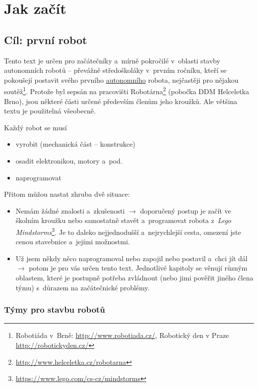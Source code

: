 \section{Jak začít}

\subsection{Cíl: první robot}

Tento text je určen pro začátečníky a~mírně pokročilé v~oblasti stavby autonomních robotů -- převážně středoškoláky v~prvním ročníku, kteří se pokoušejí postavit 
svého prvního \hyperlink{autonomni}{autonomního}
robota, nejčastěji pro nějakou soutěž\footnote{Robotiáda v~Brně: \url{http://www.robotiada.cz/}, Robotický den v Praze \url{http://robotickyden.cz/} }. 
Protože byl sepsán na pracovišti Robotárna\footnote{\url{http://www.helceletka.cz/robotarna}} (pobočka DDM Helceletka Brno), jsou některé části určené především členům jeho kroužků. Ale většina textu je použitelná všeobecně.   


Každý robot se musí 
\begin{itemize} %
\item vyrobit (mechanická část -- konstrukce)
\item osadit elektronikou, motory a~pod.
\item naprogramovat 
\end{itemize}

Přitom můžou nastat zhruba dvě situace:

\begin{itemize} %
\item  Nemám žádné znalosti a~zkušenosti $\rightarrow$ doporučený postup je začít ve školním kroužku nebo samostatně stavět a~programovat robota z~{\it Lego Mindstorms}\footnote{\url{https://www.lego.com/cs-cz/mindstorms}}.
Je to daleko nejjednodušší a~nejrychlejší cesta, omezení jste cenou stavebnice a~jejími možnostmi.
\item  Už jsem někdy něco naprogramoval nebo zapojil nebo postavil a~chci jít dál $\rightarrow$ potom je pro vás určen tento text.
Jednotlivé kapitoly se věnují různým oblastem, které je postupně potřeba zvládnout (nebo jimi pověřit jiného člena týmu) s~důrazem na začátečnické problémy.
\end{itemize}

\subsubsection{Týmy pro stavbu robotů}

